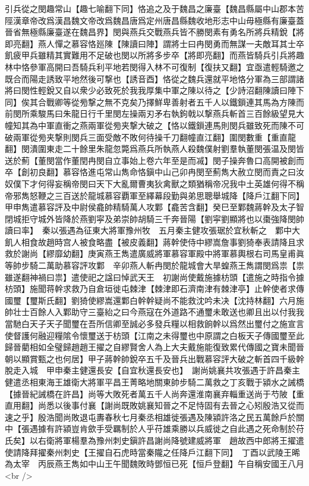引兵從之閔趣常山【趣七喻翻下同】恪追之及于魏昌之廉臺【魏昌縣屬中山郡本苦陘漢章帝改爲漢昌魏文帝改爲魏昌唐爲定州唐昌縣魏收地形志中山毋極縣有廉臺蓋晉省無極縣廉臺遂在魏昌界】閔與燕兵交戰燕兵皆不勝閔素有勇名所將兵精銳【將即亮翻】燕人憚之慕容恪廵陳【陳讀曰陣】謂將士曰冉閔勇而無謀一夫敵耳其士卒飢疲甲兵雖精其實難用不足破也閔以所將多步卒【將即亮翻】而燕皆騎兵引兵將趣林中恪參軍高開曰吾騎兵利平地若閔得入林不可復制【復扶又翻】宜亟遣輕騎邀之既合而陽走誘致平地然後可撃也【誘音酉】恪從之魏兵還就平地恪分軍為三部謂諸將曰閔性輕銳又自以衆少必致死於我我厚集中軍之陳以待之【少詩沼翻陳讀曰陣下同】俟其合戰卿等從㫄撃之無不克矣乃擇鮮卑善射者五千人以鐵鎻連其馬為方陳而前閔所乘駿馬曰朱龍日行千里閔左操兩刃矛右執鉤戟以撃燕兵斬首三百餘級望見大幢知其為中軍直衝之燕兩軍從㫄夹撃大破之【恪以鐵鎻連馬則閔兵雖致死而陳不可破兩軍從㫄夹撃則閔兵三面受敵不敗何待操千刀翻幢直江翻】圍閔數重【重直龍翻】閔潰圍東走二十餘里朱龍忽斃爲燕兵所執燕人殺魏僕射劉羣執董閔張温及閔皆送於薊【董閔當作董閏冉閔自立事始上卷六年至是而㓕】閔子操奔魯口高開被創而卒【創初良翻】慕容恪進屯常山雋命恪鎭中山己卯冉閔至薊雋大赦立閔而責之曰汝奴僕下才何得妄稱帝閔曰天下大亂爾曹夷狄禽獸之類猶稱帝况我中土英雄何得不稱帝邪雋怒鞭之三百送於龍城慕容覇軍至繹幕段勤與弟思聰舉城降【降戶江翻下同】甲申雋遣慕容評及中尉侯龕帥精騎萬人攻鄴【龕苦含翻】癸巳至鄴魏蔣幹及太子智閉城拒守城外皆降於燕劉寜及弟崇帥胡騎三千奔晉陽【劉寜劉顯將也以棗強降閔帥讀曰率】　秦以張遇為征東大將軍豫州牧　五月秦主健攻張琚於宜秋斬之　鄴中大飢人相食故趙時宫人被食略盡【被皮義翻】蔣幹使侍中繆嵩詹事劉猗奉表請降且求救於謝尚【繆靡幼翻】庚寅燕王雋遣廣威將軍慕容軍殿中將軍慕輿根右司馬皇甫眞等帥步騎二萬助慕容評攻鄴　辛卯燕人斬冉閔於龍城會大旱蝗燕王雋謂閔爲祟【祟雖遂翻神禍曰祟】遣使祀之諡曰悼武天王　初謝尚使戴施據枋頭【遣施之時指令據枋頭】施聞蒋幹求救乃自倉垣徙屯棘津【棘津即石濟南津有棘津亭】止幹使者求傳國璽【璽斯氏翻】劉猗使繆嵩還鄴白幹幹疑尚不能救沈吟未决【沈持林翻】六月施帥壮士百餘人入鄴助守三臺紿之曰今燕寇在外道路不通璽未敢送也卿且出以付我我當馳白天子天子聞璽在吾所信卿至誠必多發兵糧以相救餉幹以爲然出璽付之施宣言使督護何融迎糧隂令懷璽送于枋頭【江南之未得璽也中原謂之白板天子傳國璽至此歸晉藺相如全璧歸趙趙王擢之自繆賢舍人為上大夫戴施能復致累代傳國之寶未聞晉朝以顯賞甄之也何居】甲子蔣幹帥銳卒五千及晉兵出戰慕容評大破之斬首四千級幹脫走入城　甲申秦主健還長安【自宜秋還長安也】　謝尚姚襄共攻張遇于許昌秦主健遣丞相東海王雄衛大將軍平昌王菁略地關東帥步騎二萬救之丁亥戰于潁水之誡橋【據晉紀誡橋在許昌】尚等大敗死者萬五千人尚奔還淮南襄弃輜重送尚于芍陂【重直用翻】尚悉以後事付襄【謝尚既敗姚襄知晉之不足恃固有去晉之心矧殷浩又從而速之乎】殷浩聞尚敗退屯夀春秋七月秦丞相雄徙張遇及陳潁許洛之民五萬餘戶於關中【張遇據有許潁豈肯歛手受羈制於人乎苻雄乘勝以兵威徙之自此遇之死命制於苻氏矣】以右衛將軍楊羣為豫州刺史鎭許昌謝尚降號建威將軍　趙故西中郎將王擢遣使請降拜擢秦州刺史【王擢自石虎時當秦隴之任降戶江翻下同】　丁酉以武陵王晞為太宰　丙辰燕王雋如中山王午聞魏敗時鄧恒已死【恒戶登翻】午自稱安國王八月<br />
